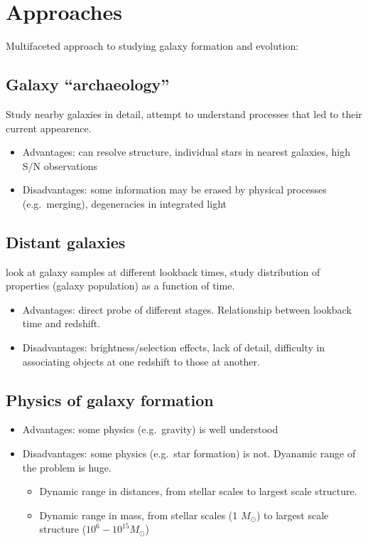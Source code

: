 \documentclass{article}
\begin{document}
\section{Approaches}
    Multifaceted approach to studying galaxy formation and evolution:
    \subsection{Galaxy ``archaeology''}
    Study nearby galaxies in detail,
    attempt to understand processes that led to their current
    appearence.
            \begin{itemize}
                \item Advantages: can resolve structure, individual stars
                    in nearest galaxies, high S/N observations
                \item Disadvantages: some information may be erased by
                    physical processes (e.g.\ merging), degeneracies in
                    integrated light
            \end{itemize}
   \subsection{Distant galaxies}
   look at galaxy samples at different lookback
   times, study distribution of properties (galaxy population) as
   a function of time.
            \begin{itemize}
                \item Advantages: direct probe of different stages.
                    Relationship between lookback time and redshift.
                \item Disadvantages: brightness/selection effects, lack
                    of detail, difficulty in associating objects at one redshift
                    to those at another.
            \end{itemize}
   \subsection{Physics of galaxy formation}
            \begin{itemize}
                \item Advantages: some physics (e.g.\ gravity) is well
                    understood
                \item Disadvantages: some physics (e.g.\ star formation)
                    is not. Dyanamic range of the problem is huge.
                    \begin{itemize}
                        \item Dynamic range in distances, from stellar scales
                            to largest scale structure.
                        \item Dynamic range in mass, from stellar scales
                            (1 $M_{\odot}$) to
                            largest scale structure ($10^6-10^{15} M_{\odot}$)
                    \end{itemize}
            \end{itemize}
\end{document}
